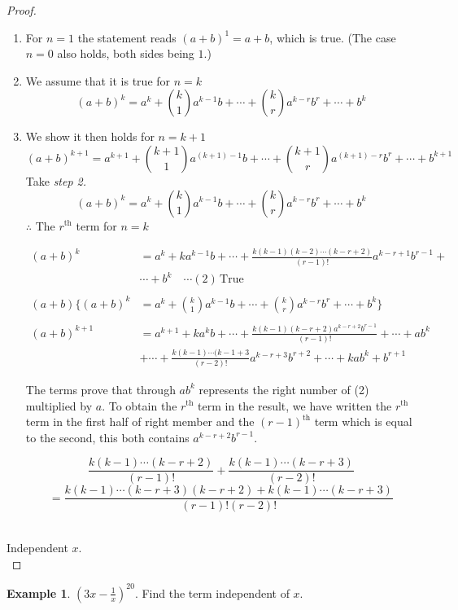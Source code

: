 \documentclass[11pt,a4paper]{article}
\theoremstyle{definition}
\newtheorem{example}[thm]{Example}
\begin{document}
\begin{proof}

\begin{enumerate}
\item[\textbf{Step 1:}] For $n=1$ the statement reads $(a+b)^{1}=a+b$, which is
true. (The case $n=0$ also holds, both sides being $1$.)
\item[\textbf{Step 2:}] We assume that it is true for $n=k$
$$(a+b)^k=a^k+
\binom{k}{1}
a^{k-1}b+\cdots +
\binom{k}{r}
a^{k-r}b^r+\cdots+b^k
$$
\item[\textbf{Step 3:}] We show it then holds for $n=k+1$
$$(a+b)^{k+1}=a^{k+1}+
\binom{k+1}{1}
a^{(k+1)-1}b+\cdots+
\binom{k+1}{r}
a^{(k+1)-r}b^r+\cdots +b^{k+1}
$$
Take \textit{step 2.}
$$(a+b)^k=a^k+
\binom{k}{1}
a^{k-1}b+\cdots +
\binom{k}{r}
a^{k-r}b^r+\cdots +b^k
$$
$\therefore$  The $r^{\text{th}}$ term for $n=k$


\begin{align*}
(a+b)^k & =  a^k+ka^{k-1}b+\cdots+\frac{k(k-1)(k-2)\cdots(k-r+2)}{(r-1)!}a^{k-r+1}b^{r-1}+\\
        & \cdots+b^k\quad  \cdots(2)\, \text{True}\\\\
(a+b)\Big\{(a+b)^k &=a^k+
\binom{k}{1}
a^{k-1}b+\cdots+
\binom{k}{r}
a^{k-r}b^r+\cdots+b^k\Big\}\\\\
(a+b)^{k+1} &=a^{k+1}+ka^kb+\cdots+\frac{k(k-1)(k-r+2)a^{k-r+2}b^{r-1}}{(r-1)!}+\cdots+ab^k\\
            &+ \cdots+\frac{k(k-1)\cdots (k-1+3}{(r-2)!}a^{k-r+3}b^{r+2}+\cdots+kab^k+b^{r+1}
\end{align*}


The terms prove that through $ab^k$ represents the right number of (2) multiplied by $a$. To obtain the $r^{\text{th}}$ term in the result, we have written the $r^{\text{th}}$ term in the first half of right member and the $(r-1)^{\text{th}}$ term which is equal to the second, this both contains $a^{k-r+2}b^{r-1}$.

$$\frac{k(k-1)\cdots (k-r+2)}{(r-1)!}+\frac{k(k-1)\cdots(k-r+3)}{(r-2)!}$$
$$=\frac{k(k-1)\cdots(k-r+3)(k-r+2)+k(k-1)\cdots (k-r+3)}{(r-1)!(r-2)!}$$\\
\end{enumerate}

Independent $x$.\\
\end{proof}
\begin{example}

$\left(3x-\frac{1}{x}\right)^{20}$. Find the term independent of $x$.
\end{example}
\end{document}

